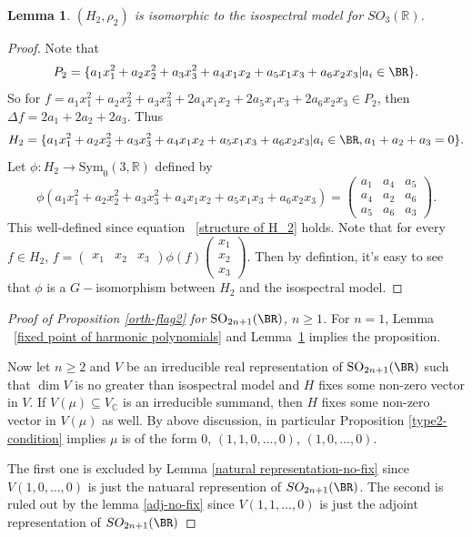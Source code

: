 \documentclass[a4paper]{amsart}
\newcommand{\BC}{{\mathbb {C}}} \newcommand{\BD}{{\mathbb {D}}}
\newcommand{\RO}{{\mathrm {O}}} \newcommand{\RP}{{\mathrm {P}}}
\newcommand{\RS}{{\mathrm {S}}} \newcommand{\RT}{{\mathrm {T}}}
\newcommand{\SO}{{\mathrm{SO}}}\newcommand{\so}{\mathfrak{so}}
\newcommand{\Sym}{{\mathrm{Sym}}}\newcommand{\sgn}{{\mathrm{sgn}}}
\theoremstyle{plain}
\newtheorem{lem}[thm]{Lemma}
\theoremstyle{remark} \newtheorem{remark}[thm]{Remark}
\theoremstyle{remark} \newtheorem{exercise}{Exercise}
\theoremstyle{remark} \newtheorem{example}{Example}
\numberwithin{equation}{section}
\begin{document}
\begin{lem}\label{adjoint representation as harmonic polynomials}
     $(H_2,\rho_2)$ is isomorphic to the isospectral model for $SO_{3}(\mathbb{R})$.
\end{lem}
\begin{proof}
    Note that $$P_2=\{a_{1}x_1^2+a_2x_2^2+a_3x_3^2+a_4x_1x_2+a_5x_1x_3+a_6x_2x_3|a_i\in \BR\}.$$
    So for $f=a_{1}x_1^2+a_2x_2^2+a_3x_3^2+2a_4x_1x_2+2a_5x_1x_3+2a_6x_2x_3\in P_2$, then $\Delta f=2a_1+2a_2+2a_3$. Thus 
    \begin{equation}\label{structure of H_2}
        H_2=\{a_{1}x_1^2+a_2x_2^2+a_3x_3^2+a_4x_1x_2+a_5x_1x_3+a_6x_2x_3|a_i\in \BR,a_1+a_2+a_3=0\}.
    \end{equation}
    Let $\phi: H_2\longrightarrow \Sym_0(3,\mathbb{R})$ defined by $$\phi(a_{1}x_1^2+a_2x_2^2+a_3x_3^2+a_4x_1x_2+a_5x_1x_3+a_6x_2x_3)=\begin{pmatrix}
        a_1&a_4&a_5\\
        a_4&a_2&a_6\\
        a_5&a_6&a_3
    \end{pmatrix}.$$
    This well-defined since equation ~\eqref{structure of H_2} holds. 
    Note that for every $f\in H_2$, $f=\begin{pmatrix}
        x_1&x_2&x_3
    \end{pmatrix}\phi(f)\begin{pmatrix}
        x_1\\x_2\\x_3
    \end{pmatrix}.$
    Then by defintion, it's easy to see that $\phi$ is a $G-$isomorphism between $H_2$ and the isospectral model.
\end{proof}
\begin{proof}[Proof of Proposition \ref{orth-flag2} for $\SO_{2n+1}(\BR)$, $n\geqslant 1$]

 For $n=1$, Lemma ~\ref{fixed point of harmonic polynomials} and Lemma~\ref{adjoint representation as harmonic polynomials} implies the proposition.

 Now let $n\geqslant 2$ and $V$ be an irreducible real representation of $\SO_{2n+1}(\BR)$ such that $\dim V$ is no greater than isospectral model and $H$ fixes some non-zero vector in $V$. If $V(\mu)\subseteq V_\BC$ is an irreducible summand, then $H$ fixes some non-zero vector in $V(\mu)$ as well. By above discussion, in particular Proposition \ref{type2-condition} implies $\mu$ is of the form $0$, $(1,1,0,\ldots,0)$, $(1,0,\dots,0)$.

 The first one is excluded by Lemma \ref{natural representation-no-fix} since $V(1,0,\dots,0)$ is just the natuaral represention of $SO_{2n+1}(\BR)$. The second is ruled out by the lemma \ref{adj-no-fix} since $V(1,1,\dots,0)$ is just the adjoint representation of $SO_{2n+1}(\BR)$
\end{proof}
\end{document}

